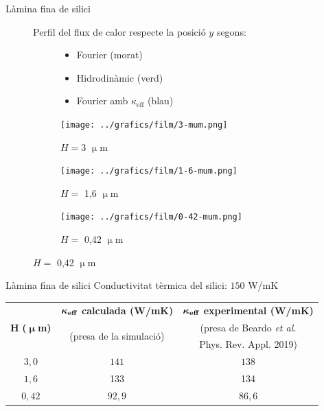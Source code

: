\documentclass{beamer}
\begin{document}
\begin{frame}{L\`{a}mina fina de silici}
\begin{figure}
\begin{center}
\vspace{-4mm}
Perfil del flux de calor respecte la posici\'{o} $y$ segons:
\begin{subfigure}{0.49\textwidth}
\begin{itemize}
\item Fourier (morat)
\item Hidrodin\`{a}mic (verd)
\item Fourier amb $\kappa_{\text{eff}}$ (blau)
\end{itemize}
\end{subfigure}
\begin{subfigure}{0.49\textwidth}
\caption*{$H=3$ $\upmu$m}
\vspace{-2mm}
\texttt{[image: ../grafics/film/3-mum.png]}
\end{subfigure}
\begin{subfigure}{0.49\textwidth}
\caption*{$H=$ 1,6 $\upmu$m}
\vspace{-2mm}
\texttt{[image: ../grafics/film/1-6-mum.png]}
\end{subfigure}
\begin{subfigure}{0.49\textwidth}
\caption*{$H=$ 0,42 $\upmu$m}
\vspace{-2mm}
\texttt{[image: ../grafics/film/0-42-mum.png]}
\end{subfigure}
\end{center}
\end{figure}
\end{frame}

\begin{frame}{L\`{a}mina fina de silici}
Conductivitat t\`{e}rmica del silici: $150$ W/mK
\begin{table}[ht!]
\centering
\label{Tab:keff}
\begin{tabular}{c|c|c}
\multirow{3}{*}{$\boldsymbol{H}$ \textbf{(}$\boldsymbol{\upmu}$\textbf{m)}}&$\boldsymbol{\kappa}_{\text{\textbf{eff}}}$ \textbf{calculada (W/mK)}&$\boldsymbol{\kappa}_{\text{\textbf{eff}}}$ \textbf{experimental (W/mK)}\vspace{-0.7mm}\\
&\multirow{2}{*}{\footnotesize{(presa de la simulaci\'{o})}}&\footnotesize{(presa de Beardo \emph{et al.}}\vspace{-0.7mm}\\
&&\footnotesize{Phys. Rev. Appl. 2019)}\\\hline
$3,0$&$141$&$138$\\
\pause
$1,6$&133&134\\
\pause
$0,42$&$92,9$&$86,6$
\end{tabular}
\end{table}
\end{frame}
\end{document}

